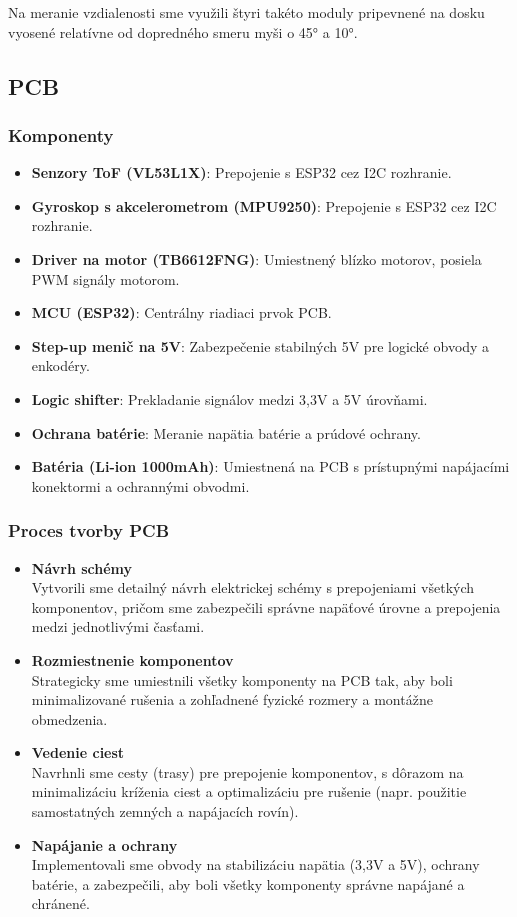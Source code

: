 Na meranie vzdialenosti sme využili štyri takéto moduly pripevnené na dosku vyosené relatívne od dopredného smeru myši o 45° a 10°.

\subsection{PCB}
\subsubsection{Komponenty}
\begin{itemize}
    \item \textbf{Senzory ToF (VL53L1X)}: Prepojenie s ESP32 cez I2C rozhranie.
    \item \textbf{Gyroskop s akcelerometrom (MPU9250)}: Prepojenie s ESP32 cez I2C rozhranie.
    \item \textbf{Driver na motor (TB6612FNG)}: Umiestnený blízko motorov, posiela PWM signály motorom.
    \item \textbf{MCU (ESP32)}: Centrálny riadiaci prvok PCB.
    \item \textbf{Step-up menič na 5V}: Zabezpečenie stabilných 5V pre logické obvody a enkodéry.
    \item \textbf{Logic shifter}: Prekladanie signálov medzi 3,3V a 5V úrovňami.
    \item \textbf{Ochrana batérie}: Meranie napätia batérie a prúdové ochrany.
    \item \textbf{Batéria (Li-ion 1000mAh)}: Umiestnená na PCB s prístupnými napájacími konektormi a ochrannými obvodmi.
\end{itemize}

\subsubsection{Proces tvorby PCB}
\begin{itemize}

\item \textbf{Návrh schémy}\\
Vytvorili sme detailný návrh elektrickej schémy s prepojeniami všetkých komponentov, pričom sme zabezpečili správne napäťové úrovne a prepojenia medzi jednotlivými časťami.

\item \textbf{Rozmiestnenie komponentov}\\
Strategicky sme umiestnili všetky komponenty na PCB tak, aby boli minimalizované rušenia a zohľadnené fyzické rozmery a montážne obmedzenia.

\item \textbf{Vedenie ciest}\\
Navrhnli sme cesty (trasy) pre prepojenie komponentov, s dôrazom na minimalizáciu kríženia ciest a optimalizáciu pre rušenie (napr. použitie samostatných zemných a napájacích rovín).

\item \textbf{Napájanie a ochrany}\\
Implementovali sme obvody na stabilizáciu napätia (3,3V a 5V), ochrany batérie, a zabezpečili, aby boli všetky komponenty správne napájané a chránené.
 
\end{itemize}

